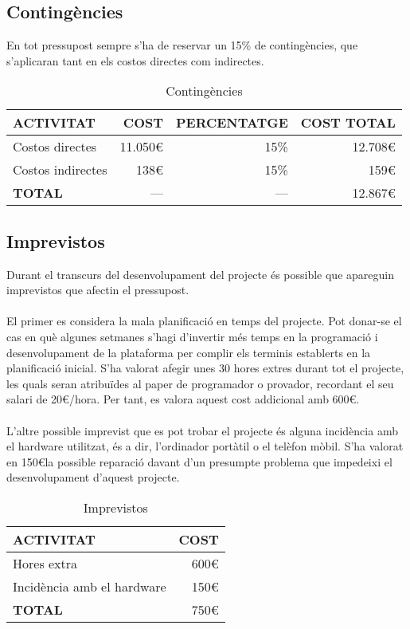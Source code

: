 \subsection{Contingències}

En tot pressupost sempre s'ha de reservar un 15\% de contingències, que s'aplicaran tant en els costos directes com indirectes.
\\
\begin{table}[H]
\centering
\begin{tabular}{ | l | r | r | r |}
\hline
\textbf{ACTIVITAT}&\textbf{COST}&\textbf{PERCENTATGE}&\textbf{COST TOTAL} \\ \hline
Costos directes & 11.050\euro & 15\% & 12.708\euro \\ \hline
Costos indirectes & 138\euro & 15\% & 159\euro \\ \hline
\textbf{TOTAL} & --- & --- & 12.867\euro \\
\hline
\end{tabular}
\caption{Contingències}
\end{table}

\subsection{Imprevistos}

Durant el transcurs del desenvolupament del projecte és possible que apareguin imprevistos que afectin el pressupost.
\\\\
El primer es considera la mala planificació en temps del projecte. Pot donar-se el cas en què algunes setmanes s'hagi d'invertir més temps en la programació i desenvolupament de la plataforma per complir els terminis establerts en la planificació inicial. S'ha valorat afegir unes 30 hores extres durant tot el projecte, les quals seran atribuïdes al paper de programador o provador, recordant el seu salari de 20\euro/hora. Per tant, es valora aquest cost addicional amb 600\euro.
\\\\
L'altre possible imprevist que es pot trobar el projecte és alguna incidència amb el hardware utilitzat, és a dir, l'ordinador portàtil o el telèfon mòbil. S'ha valorat en 150\euro\space la possible reparació davant d'un presumpte problema que impedeixi el desenvolupament d'aquest projecte.
\\
\begin{table}[H]
\centering
\begin{tabular}{ | l | r |}
\hline
\textbf{ACTIVITAT} &\textbf{COST} \\ \hline
Hores extra & 600\euro \\ \hline
Incidència amb el hardware & 150\euro \\ \hline
\textbf{TOTAL} & 750\euro \\
\hline
\end{tabular}
\caption{Imprevistos}
\end{table}


